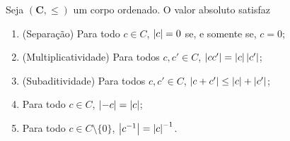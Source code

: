 \begin{proposition}
Seja $(\bm C,\leq)$ um corpo ordenado. O valor absoluto satisfaz
	\begin{enumerate}
	\item (Separação) Para todo $c \in C$, $\left\vert{c}\right\vert=0$ se, e somente se, $c=0$;
	\item (Multiplicatividade) Para todos $c,c' \in C$, $\left\vert{cc'}\right\vert=\left\vert{c}\right\vert\left\vert{c'}\right\vert$;
	\item (Subaditividade) Para todos $c,c' \in C$, $\left\vert{c+c'}\right\vert \leq \left\vert{c}\right\vert + \left\vert{c'}\right\vert$;

	\item Para todo $c \in C$, $\left\vert{-c}\right\vert = \left\vert{c}\right\vert$;
	\item Para todo $c \in C \setminus \{0\}$, $\left\vert{c^{-1}}\right\vert = \left\vert{c}\right\vert^{-1}$.
	\end{enumerate}
\end{proposition}
